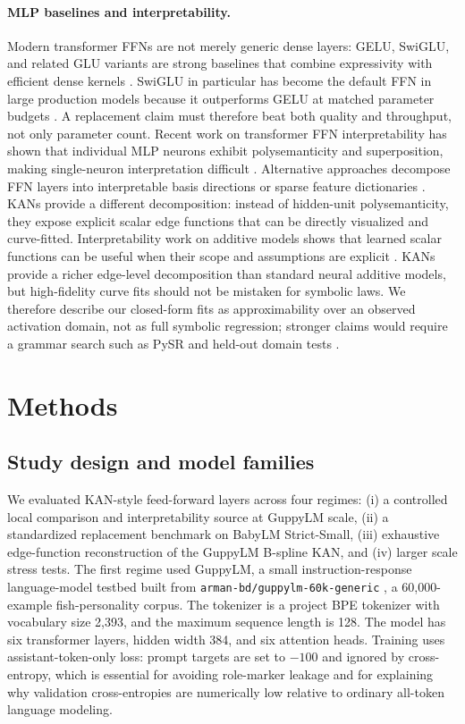 \documentclass[11pt]{article}
\begin{document}
\paragraph{MLP baselines and interpretability.}
Modern transformer FFNs are not merely generic dense layers: GELU, SwiGLU, and related GLU variants are strong baselines that combine expressivity with efficient dense kernels \cite{shazeer2020glu}. SwiGLU in particular has become the default FFN in large production models because it outperforms GELU at matched parameter budgets \cite{chowdhery2022palm,touvron2023llama}. A replacement claim must therefore beat both quality and throughput, not only parameter count. Recent work on transformer FFN interpretability has shown that individual MLP neurons exhibit polysemanticity and superposition, making single-neuron interpretation difficult \cite{elhage2022superposition,gurnee2023finding}. Alternative approaches decompose FFN layers into interpretable basis directions or sparse feature dictionaries \cite{cunningham2023sparse,bricken2023monosemanticity}. KANs provide a different decomposition: instead of hidden-unit polysemanticity, they expose explicit scalar edge functions that can be directly visualized and curve-fitted. Interpretability work on additive models shows that learned scalar functions can be useful when their scope and assumptions are explicit \cite{agarwal2021nam}. KANs provide a richer edge-level decomposition than standard neural additive models, but high-fidelity curve fits should not be mistaken for symbolic laws. We therefore describe our closed-form fits as approximability over an observed activation domain, not as full symbolic regression; stronger claims would require a grammar search such as PySR and held-out domain tests \cite{cranmer2023pysr}.

\section{Methods}

\subsection{Study design and model families}

We evaluated KAN-style feed-forward layers across four regimes: (i) a controlled local comparison and interpretability source at GuppyLM scale, (ii) a standardized replacement benchmark on BabyLM Strict-Small, (iii) exhaustive edge-function reconstruction of the GuppyLM B-spline KAN, and (iv) larger scale stress tests. The first regime used GuppyLM, a small instruction-response language-model testbed built from \texttt{arman-bd/guppylm-60k-generic} \cite{guppylm60k}, a 60,000-example fish-personality corpus. The tokenizer is a project BPE tokenizer with vocabulary size 2,393, and the maximum sequence length is 128. The model has six transformer layers, hidden width 384, and six attention heads. Training uses assistant-token-only loss: prompt targets are set to \(-100\) and ignored by cross-entropy, which is essential for avoiding role-marker leakage and for explaining why validation cross-entropies are numerically low relative to ordinary all-token language modeling.
\end{document}
